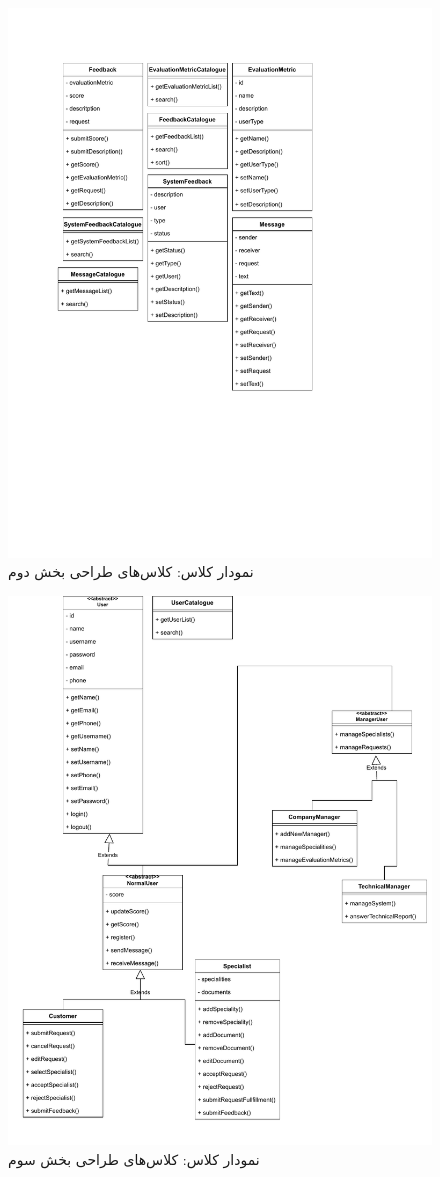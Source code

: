 \begin{figure}[ht!]
	\centering
	\includegraphics[scale=0.8]{figs/OOD-class-page-2.pdf}
	\caption{نمودار کلاس: کلاس‌های طراحی بخش دوم}
\end{figure}
\FloatBarrier
\newpage

\begin{figure}[ht!]
	\centering
	\includegraphics[scale=0.8]{figs/OOD-class-page-3.pdf}
	\caption{نمودار کلاس: کلاس‌های طراحی بخش سوم}
\end{figure}
\FloatBarrier
\newpage